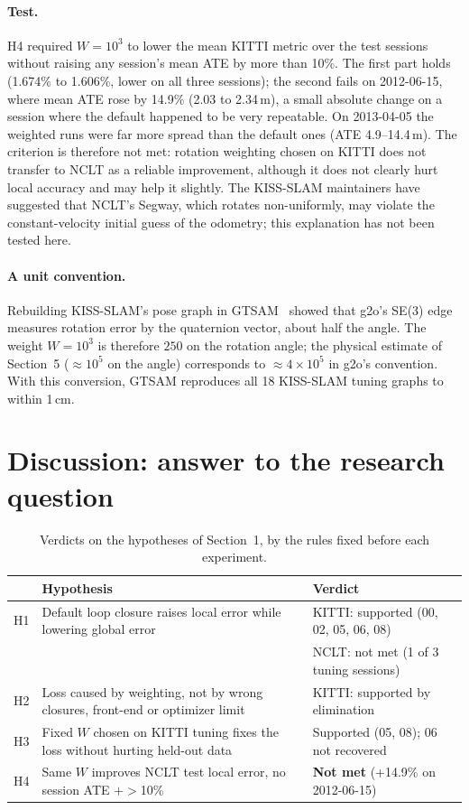 \documentclass[11pt,a4paper]{article}
\begin{document}
\paragraph{Test.} H4 required $W=10^3$ to lower the mean KITTI metric over the test sessions without raising any
session's mean ATE by more than 10\%. The first part holds (1.674\% to 1.606\%, lower on all three sessions); the
second fails on 2012-06-15, where mean ATE rose by 14.9\% (2.03 to 2.34\,m), a small absolute change on a session
where the default happened to be very repeatable. On 2013-04-05 the weighted runs were far more spread than the
default ones (ATE 4.9--14.4\,m). The criterion is therefore not met: rotation weighting chosen on KITTI does not
transfer to NCLT as a reliable improvement, although it does not clearly hurt local accuracy and may help it
slightly. The KISS-SLAM maintainers have suggested that NCLT's Segway, which rotates non-uniformly, may violate
the constant-velocity initial guess of the odometry; this explanation has not been tested here.

\paragraph{A unit convention.} Rebuilding KISS-SLAM's pose graph in GTSAM~\cite{gtsam} showed that g2o's SE(3) edge
measures rotation error by the quaternion vector, about half the angle. The weight $W=10^3$ is therefore $250$ on
the rotation angle; the physical estimate of Section~5 ($\approx 10^5$ on the angle) corresponds to
$\approx 4\times 10^5$ in g2o's convention. With this conversion, GTSAM reproduces all 18 KISS-SLAM tuning graphs
to within 1\,cm.

\section{Discussion: answer to the research question}
\label{sec:discussion}

\begin{table}[h]
\centering
\small
\begin{tabularx}{\linewidth}{lXl}
\toprule
 & Hypothesis & Verdict \\
\midrule
H1 & Default loop closure raises local error while lowering global error &
     KITTI: supported (00, 02, 05, 06, 08) \\
   & & NCLT: not met (1 of 3 tuning sessions) \\
H2 & Loss caused by weighting, not by wrong closures, front-end or optimizer limit &
     KITTI: supported by elimination \\
H3 & Fixed $W$ chosen on KITTI tuning fixes the loss without hurting held-out data &
     Supported (05, 08); 06 not recovered \\
H4 & Same $W$ improves NCLT test local error, no session ATE $+>$10\% &
     \textbf{Not met} (+14.9\% on 2012-06-15) \\
\bottomrule
\end{tabularx}
\caption{Verdicts on the hypotheses of Section~1, by the rules fixed before each experiment.}
\label{tab:verdicts}
\end{table}
\end{document}
